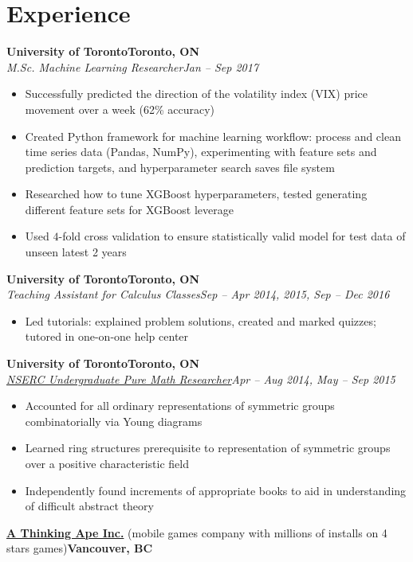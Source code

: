 \documentclass[10pt,letterpaper]{article}
\newcommand*\company[1]{\textbf{#1}}
\newcommand*\position[1]{\textit{#1}}
\newcommand*\location\company
\newcommand*\timespan\position
\begin{document}
\section*{Experience}
\company{University of Toronto}\hfill\location{Toronto, ON}\\
\position{M.Sc. Machine Learning Researcher}\hfill\timespan{Jan -- Sep 2017}
\begin{itemize}
\item Successfully predicted the direction of the volatility index (VIX) price movement over a week (62\% accuracy)
\item Created Python framework for machine learning workflow: process and clean time series data (Pandas, NumPy), experimenting with feature sets and prediction targets, and hyperparameter search saves file system
\item Researched how to tune XGBoost hyperparameters, tested generating different feature sets for XGBoost leverage
\item Used \(4\)-fold cross validation to ensure statistically valid model for test data of unseen latest 2 years
\end{itemize}
\company{University of Toronto}\hfill\location{Toronto, ON}\\
\position{Teaching Assistant for Calculus Classes}\hfill\timespan{Sep -- Apr 2014, 2015, Sep -- Dec 2016}
\begin{itemize}
\item Led tutorials: explained problem solutions, created and marked quizzes; tutored in one-on-one help center
\end{itemize}
\company{University of Toronto}\hfill\location{Toronto, ON}\\
\position{\href{http://www.nserc-crsng.gc.ca/Students-Etudiants/UG-PC/USRA-BRPC_eng.asp}{NSERC Undergraduate Pure Math Researcher}}\hfill\timespan{Apr -- Aug 2014, May -- Sep 2015}
\begin{itemize}
\item Accounted for all ordinary representations of symmetric groups combinatorially via Young diagrams
\item Learned ring structures prerequisite to representation of symmetric groups over a positive characteristic field
\item Independently found increments of appropriate books to aid in understanding of difficult abstract theory
\end{itemize}
\company{\href{http://www.athinkingape.com/}{A Thinking Ape Inc.}} (mobile games company with millions of installs on 4 stars games)\hfill\location{Vancouver, BC}\\
\end{document}
